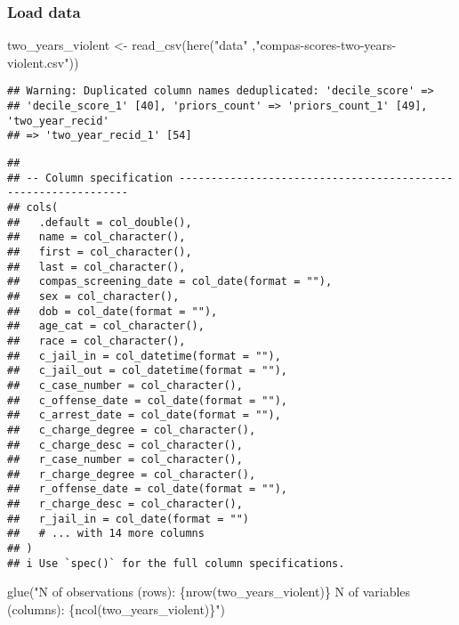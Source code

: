 \documentclass[
]{book}
\newenvironment{Shaded}{\begin{snugshade}}{\end{snugshade}}
\newcommand{\FunctionTok}[1]{\textcolor[rgb]{0.00,0.00,0.00}{#1}}
\newcommand{\NormalTok}[1]{#1}
\newcommand{\OtherTok}[1]{\textcolor[rgb]{0.56,0.35,0.01}{#1}}
\newcommand{\StringTok}[1]{\textcolor[rgb]{0.31,0.60,0.02}{#1}}
\begin{document}
\hypertarget{load-data-1}{%
\subsubsection{Load data}\label{load-data-1}}

\begin{Shaded}
\begin{Highlighting}[]
\NormalTok{two\_years\_violent }\OtherTok{\textless{}{-}} \FunctionTok{read\_csv}\NormalTok{(}\FunctionTok{here}\NormalTok{(}\StringTok{"data"}\NormalTok{ ,}\StringTok{"compas{-}scores{-}two{-}years{-}violent.csv"}\NormalTok{))}
\end{Highlighting}
\end{Shaded}

\begin{verbatim}
## Warning: Duplicated column names deduplicated: 'decile_score' =>
## 'decile_score_1' [40], 'priors_count' => 'priors_count_1' [49], 'two_year_recid'
## => 'two_year_recid_1' [54]
\end{verbatim}

\begin{verbatim}
## 
## -- Column specification --------------------------------------------------------------
## cols(
##   .default = col_double(),
##   name = col_character(),
##   first = col_character(),
##   last = col_character(),
##   compas_screening_date = col_date(format = ""),
##   sex = col_character(),
##   dob = col_date(format = ""),
##   age_cat = col_character(),
##   race = col_character(),
##   c_jail_in = col_datetime(format = ""),
##   c_jail_out = col_datetime(format = ""),
##   c_case_number = col_character(),
##   c_offense_date = col_date(format = ""),
##   c_arrest_date = col_date(format = ""),
##   c_charge_degree = col_character(),
##   c_charge_desc = col_character(),
##   r_case_number = col_character(),
##   r_charge_degree = col_character(),
##   r_offense_date = col_date(format = ""),
##   r_charge_desc = col_character(),
##   r_jail_in = col_date(format = "")
##   # ... with 14 more columns
## )
## i Use `spec()` for the full column specifications.
\end{verbatim}

\begin{Shaded}
\begin{Highlighting}[]
\FunctionTok{glue}\NormalTok{(}\StringTok{"N of observations (rows): \{nrow(two\_years\_violent)\}}
\StringTok{      N of variables (columns): \{ncol(two\_years\_violent)\}"}\NormalTok{)}
\end{Highlighting}
\end{Shaded}
\end{document}
